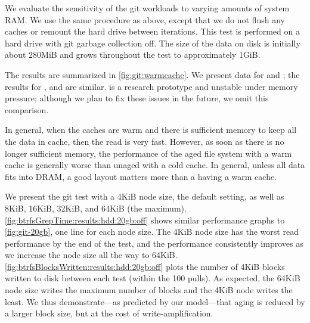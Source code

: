 We evaluate the sensitivity of the git workloads to varying amounts of system
RAM.  We use the same procedure as above, except that we do not flush any
caches or remount the hard drive between iterations.  This test is performed on
a hard drive with git garbage collection off.  The size of the data on disk is
initially about 280MiB and grows throughout the test to approximately 1GiB.



The results are summarized in \cref{fig:git:warmcache}. We present data for \ext
and \ftwofs; the results for \btrfs, \xfs and \zfs are similar. \betrfs is a
research prototype and unstable under memory pressure; although we plan to fix
these issues in the future, we omit this comparison.

In general, when the caches are warm and there is sufficient memory to keep all
the data in cache, then the read is very fast. However, as soon as there is no
longer sufficient memory, the performance of the aged file system with a warm
cache is generally worse than unaged with a cold cache.  In general, unless all
data fits into DRAM, a good layout matters more than a having a warm cache.

We present the git test with a 4KiB node size, the default setting, as well as
8KiB, 16KiB, 32KiB, and 64KiB (the maximum).
\cref{fig:btrfsGrepTime:results:hdd:20gb:off} shows similar performance graphs to
\cref{fig:git-20gb}, one line for each node size.  The 4KiB node size has the
worst read performance by the end of the test, and the performance consistently
improves as we increase the node size all the way to 64KiB.
\cref{fig:btrfsBlocksWritten:results:hdd:20gb:off} plots the number of 4KiB
blocks written to disk between each test (within the 100 pulls).  As expected,
the 64KiB node size writes the maximum number of blocks and the 4KiB node
writes the least.  We thus demonstrate---as predicted by our model---that aging
is reduced by a larger block size, but at the cost of write-amplification.


